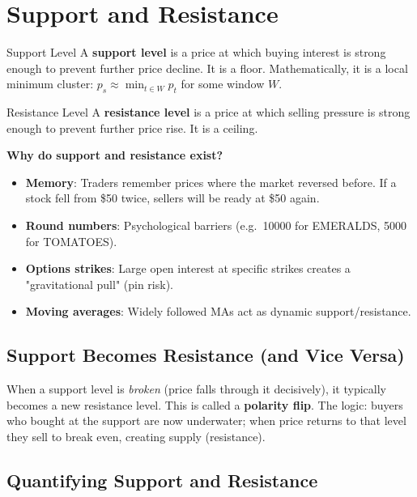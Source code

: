 \documentclass[12pt,a4paper,openany]{report}
\theoremstyle{definition}
\begin{document}
\section{Support and Resistance}

\begin{definitionbox}{Support Level}
A \textbf{support level} is a price at which buying interest is strong enough to prevent further price decline. It is a floor. Mathematically, it is a local minimum cluster: $p_s \approx \min_{t \in W} p_t$ for some window $W$.
\end{definitionbox}

\begin{definitionbox}{Resistance Level}
A \textbf{resistance level} is a price at which selling pressure is strong enough to prevent further price rise. It is a ceiling.
\end{definitionbox}

\textbf{Why do support and resistance exist?}
\begin{itemize}
  \item \textbf{Memory}: Traders remember prices where the market reversed before. If a stock fell from \$50 twice, sellers will be ready at \$50 again.
  \item \textbf{Round numbers}: Psychological barriers (e.g.\ 10000 for EMERALDS, 5000 for TOMATOES).
  \item \textbf{Options strikes}: Large open interest at specific strikes creates a "gravitational pull" (pin risk).
  \item \textbf{Moving averages}: Widely followed MAs act as dynamic support/resistance.
\end{itemize}

\subsection{Support Becomes Resistance (and Vice Versa)}

When a support level is \emph{broken} (price falls through it decisively), it typically becomes a new resistance level. This is called a \textbf{polarity flip}. The logic: buyers who bought at the support are now underwater; when price returns to that level they sell to break even, creating supply (resistance).

\subsection{Quantifying Support and Resistance}
\end{document}
